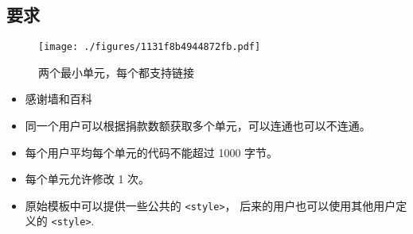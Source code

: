 
\subsection{要求}

\begin{figure}[ht]
\centering
\texttt{[image: ./figures/1131f8b4944872fb.pdf]}
\caption{两个最小单元，每个都支持链接} \label{fig_thanks_1}
\end{figure}

\begin{itemize}
\item 感谢墙和百科
\item 同一个用户可以根据捐款数额获取多个单元，可以连通也可以不连通。
\item 每个用户平均每个单元的代码不能超过 1000 字节。
\item 每个单元允许修改 1 次。
\item 原始模板中可以提供一些公共的 \verb`<style>`， 后来的用户也可以使用其他用户定义的 \verb`<style>`.
\end{itemize}

